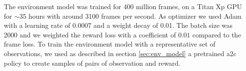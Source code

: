 The environment model was trained for 400 million frames, on a Titan Xp GPU for $\sim$35 hours with around 3100 frames per second. As optimizer we used Adam with a learning rate of $0.0007$ and a weight decay of 0.01. The batch size was 2000 and we weighted the reward loss with a coefficient of $0.01$ compared to the frame loss. To train the environment model with a representative set of observations, we used as described in section \ref{sec:env_model} a pretrained a2c policy to create samples of pairs of observation and reward.

